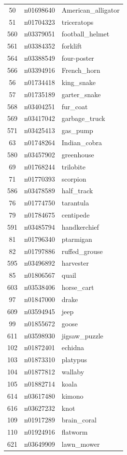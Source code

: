 \begin{table}
\begin{tabular}{cll}
50 & n01698640 & American_alligator \\
51 & n01704323 & triceratops \\
560 & n03379051 & football_helmet \\
561 & n03384352 & forklift \\
564 & n03388549 & four-poster \\
566 & n03394916 & French_horn \\
56 & n01734418 & king_snake \\
57 & n01735189 & garter_snake \\
568 & n03404251 & fur_coat \\
569 & n03417042 & garbage_truck \\
571 & n03425413 & gas_pump \\
63 & n01748264 & Indian_cobra \\
580 & n03457902 & greenhouse \\
69 & n01768244 & trilobite \\
71 & n01770393 & scorpion \\
586 & n03478589 & half_track \\
76 & n01774750 & tarantula \\
79 & n01784675 & centipede \\
591 & n03485794 & handkerchief \\
81 & n01796340 & ptarmigan \\
82 & n01797886 & ruffed_grouse \\
595 & n03496892 & harvester \\
85 & n01806567 & quail \\
603 & n03538406 & horse_cart \\
97 & n01847000 & drake \\
609 & n03594945 & jeep \\
99 & n01855672 & goose \\
611 & n03598930 & jigsaw_puzzle \\
102 & n01872401 & echidna \\
103 & n01873310 & platypus \\
104 & n01877812 & wallaby \\
105 & n01882714 & koala \\
614 & n03617480 & kimono \\
616 & n03627232 & knot \\
109 & n01917289 & brain_coral \\
110 & n01924916 & flatworm \\
621 & n03649909 & lawn_mower \\

\end{tabular}
\end{table}
